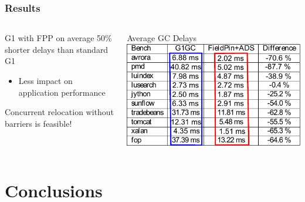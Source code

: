 \documentclass{beamer}
\newcommand{\linespace}{\vskip 0.25cm}
\begin{document}
\begin{frame}

\frametitle{Results}

\begin{columns}
\begin{column}{0.5\textwidth}

\color{red}G1 with FPP \color{black}on average 50\% shorter delays than \color{blue}standard G1\color{black}
\begin{itemize}
\item Less impact on application performance
\end{itemize}

\linespace
\linespace

Concurrent relocation without barriers is feasible!

\end{column}

\begin{column}{0.5\textwidth}

\begin{center}
Average GC Delays
\includegraphics[width=.90\textwidth]{Illustrations/fpp_results_3.pdf}
\end{center}
\end{column}
\end{columns}

\end{frame}



\section[Conclusions]{Conclusions}
\end{document}
